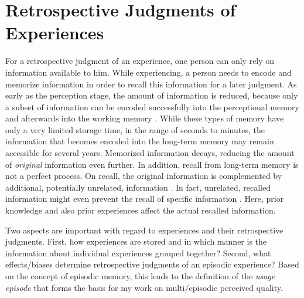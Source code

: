 \section{Retrospective Judgments of Experiences}\label{chap:03}
For a retrospective judgment of an experience, one person can only rely on information available to him.
While experiencing, a person needs to encode and memorize information in order to recall this information for a later judgment.
As early as the perception stage, the amount of information is reduced, because only a subset of information can be encoded successfully into the perceptional memory and afterwards into the working memory \citep[][p.\,8f.]{raake_speech_2006}.
While these types of memory have only a very limited storage time, in the range of seconds to minutes, the information that becomes encoded into the long-term memory may remain accessible for several years.
Memorized information decays, reducing the amount of \emph{original} information even further.
In addition, recall from long-term memory is not a perfect process.
On recall, the original information is complemented by additional, potentially unrelated, information \citep[\cf,][]{schacter_seven_2003}.
In fact, unrelated, recalled information might even prevent the recall of specific information \citep[\cf,][]{schacter_seven_2003}.
Here, prior knowledge and also prior experiences affect the actual recalled information.

Two aspects are important with regard to experiences and their retrospective judgments.
First, how experiences are stored and in which manner is the information about individual experiences grouped together?
Second, what effects/biases determine retrospective judgments of an episodic experience?
Based on the concept of episodic memory, this leads to the definition of the \emph{usage episode} that forms the basis for my work on multi\-/episodic perceived quality.

